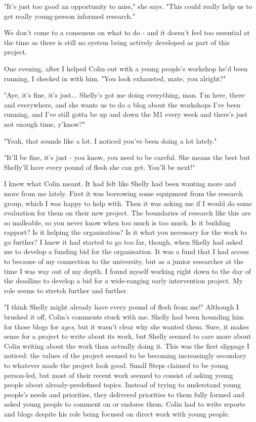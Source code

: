 "It's just too good an opportunity to miss," she says. "This could really help us to get really young-person informed research."

We don't come to a consensus on what to do - and it doesn't feel too essential at the time as there is still no system being actively developed as part of this project. 

One evening, after I helped Colin out with a young people's workshop he'd been running, I checked in with him. "You look exhausted, mate, you alright?"

"Aye, it's fine, it's just... Shelly's got me doing everything, man. I'm here, there and everywhere, and she wants us to do a blog about the workshops I've been running, and I've still gotta be up and down the M1 every week and there's just not enough time, y'know?"

"Yeah, that sounds like a lot. I noticed you've been doing a lot lately."

"It'll be fine, it's just - you know, you need to be careful. She means the best but Shelly'll have every pound of flesh she can get. You'll be next!"

I knew what Colin meant. It had felt like Shelly had been wanting more and more from me lately. First it was borrowing some equipment from the research group, which I was happy to help with. Then it was asking me if I would do some evaluation for them on their new project. The boundaries of research like this are so malleable, so you never know when too much is too much. Is it building rapport? Is it helping the organisation? Is it what you necessary for the work to go further? I knew it had started to go too far, though, when Shelly had asked me to develop a funding bid for the organisation. It was a fund that I had access to because of my connection to the university, but as a junior researcher at the time I was way out of my depth. I found myself working right down to the day of the deadline to develop a bid for a wide-ranging early intervention project. My role seems to stretch further and further. 

"I think Shelly might already have every pound of flesh from me!" Although I brushed it off, Colin's comments stuck with me. Shelly had been hounding him for those blogs for \textit{ages}, but it wasn't clear why she wanted them. Sure, it makes sense for a project to write about its work, but Shelly seemed to care more about Colin writing about the work than actually doing it. This was the first slippage I noticed: the values of the project seemed to be becoming increasingly secondary to whatever made the project look good. Small Steps claimed to be young person-led, but most of their recent work seemed to consist of asking young people about already-predefined topics. Instead of trying to understand young people's needs and priorities, they delivered priorities to them fully formed and asked young people to comment on or endorse them. Colin had to write reports and blogs despite his role being focused on direct work with young people.

